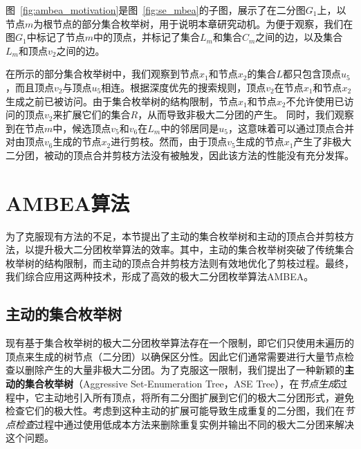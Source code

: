\begin{example}
  图~\ref{fig:ambea_motivation}是图~\ref{fig:se_mbea}的子图，展示了在二分图$G_1$上，以节点$m$为根节点的部分集合枚举树，用于说明本章研究动机。为便于观察，我们在图$G_1$中标记了节点$m$中的顶点，并标记了集合$L_m$和集合$C_m$之间的边，以及集合$L_m$和顶点$v_2$之间的边。

  在所示的部分集合枚举树中，我们观察到节点$x_1$和节点$x_2$的集合$L$都只包含顶点$u_5$，而且顶点$v_2$与顶点$u_5$相连。根据深度优先的搜索规则，顶点$v_2$在节点$x_1$和节点$x_2$生成之前已被访问。由于集合枚举树的结构限制，节点$x_1$和节点$x_2$不允许使用已访问的顶点$v_2$来扩展它们的集合$R$，从而导致非极大二分团的产生。
  同时，我们观察到在节点$m$中，候选顶点$v_5$和$v_6$在$L_m$中的邻居同是$u_5$，这意味着可以通过顶点合并对由顶点$v_6$生成的节点$x_2$进行剪枝。然而，由于顶点$v_5$生成的节点$x_1$产生了非极大二分团，被动的顶点合并剪枝方法没有被触发，因此该方法的性能没有充分发挥。

\end{example}

\section{AMBEA算法}

为了克服现有方法的不足，本节提出了主动的集合枚举树和主动的顶点合并剪枝方法，以提升极大二分团枚举算法的效率。其中，主动的集合枚举树突破了传统集合枚举树的结构限制，而主动的顶点合并剪枝方法则有效地优化了剪枝过程。最终，我们综合应用这两种技术，形成了高效的极大二分团枚举算法AMBEA。

\subsection{主动的集合枚举树}
\label{subsec:ase}

现有基于集合枚举树的极大二分团枚举算法存在一个限制，即它们只使用未遍历的顶点来生成的树节点（二分团）以确保区分性。因此它们通常需要进行大量节点检查以删除产生的大量非极大二分团。为了克服这一限制，我们提出了一种新颖的\textbf{主动的集合枚举树}（Aggressive Set-Enumeration Tree，ASE Tree），在\textit{节点生成}过程中，它主动地引入所有顶点，将所有二分图扩展到它们的极大二分团形式，避免检查它们的极大性。考虑到这种主动的扩展可能导致生成重复的二分图，我们在\textit{节点检查}过程中通过使用低成本方法来删除重复实例并输出不同的极大二分团来解决这个问题。


